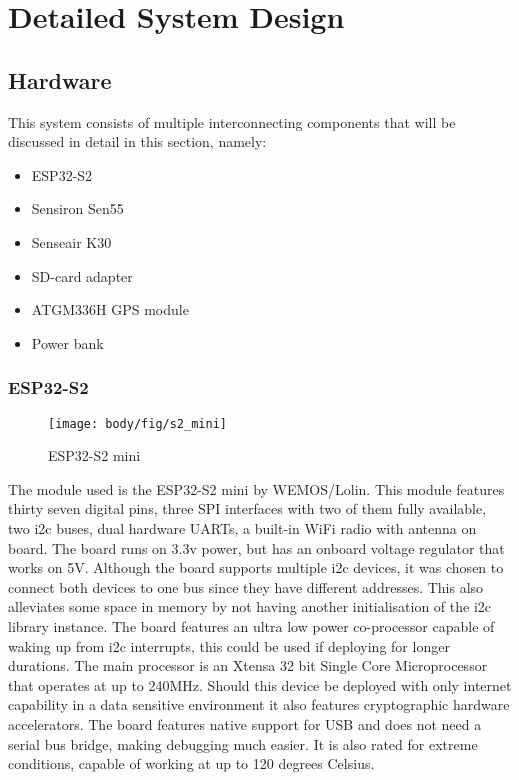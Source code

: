 \chapter{Detailed System Design}
\vspace{-2em}
\section{Hardware}


This system consists of multiple interconnecting components that will be discussed in detail in this section, namely:
\begin{itemize}
	\item ESP32-S2
	\item Sensiron Sen55
	\item Senseair K30
	\item SD-card adapter
	\item ATGM336H GPS module
	\item Power bank	
\end{itemize} 




\subsection{ESP32-S2}

\begin{figure}[!htb]
	\centering
	\texttt{[image: body/fig/s2\_mini]}
	\caption{ESP32-S2 mini}
	\label{fig:s2mini}
\end{figure}


\noindent
The module used is the ESP32-S2 mini by WEMOS/Lolin. This module features thirty seven digital pins, three SPI interfaces with two of them fully available, two i2c buses, dual hardware UARTs, a built-in WiFi radio with antenna on board. The board runs on 3.3v power, but has an onboard voltage regulator that works on 5V. Although the board supports multiple i2c devices, it was chosen to connect both devices to one bus since they have different addresses. This also alleviates some space in memory by not having another initialisation of the i2c library instance. The board features an ultra low power co-processor capable of waking up from i2c interrupts, this could be used if deploying for longer durations. The main processor is an {Xtensa\textregistered}  32 bit Single Core Microprocessor that operates at up to 240MHz. Should this device be deployed with only internet capability in a data sensitive environment it also features cryptographic hardware accelerators. The board features native support for USB and does not need a serial bus bridge, making debugging much easier. It is also rated for extreme conditions, capable of working at up to 120 degrees Celsius\cite{wemos2021s2mini}.


